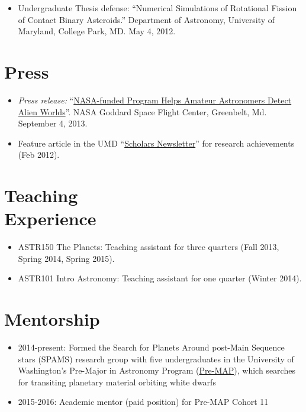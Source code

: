 \documentclass[margin]{res}
\begin{document}
\begin{resume}
\begin{itemize}
\item Undergraduate Thesis defense:  ``Numerical Simulations of Rotational Fission of Contact Binary Asteroids.'' Department of Astronomy, University of Maryland, College Park, MD. May 4, 2012.\\
\end{itemize}



\section{Press} 
\begin{itemize}
\item {\it Press release:} ``\href{http://www.nasa.gov/content/nasa-funded-program-helps-amateur-astronomers-detect-alien-worlds/}{NASA-funded Program Helps Amateur Astronomers Detect Alien Worlds}''. NASA Goddard Space Flight Center, Greenbelt, Md. September 4, 2013.

\item Feature article in the UMD ``\href{http://www.scholars.umd.edu/news/newsletter/363-february-2012-issue-1}{Scholars Newsletter}'' for research achievements (Feb 2012).\\
\end{itemize}              


\section{Teaching \\Experience}
\begin{itemize}   
\item ASTR150 The Planets: Teaching assistant for three quarters (Fall 2013, Spring 2014, Spring 2015).

\item ASTR101 Intro Astronomy: Teaching assistant for one quarter (Winter 2014). \\
\end{itemize}

\section{Mentorship}
\begin{itemize}
\item 2014-present: Formed the Search for Planets Around post-Main Sequence stars (SPAMS) research group with five undergraduates in the University of Washington's Pre-Major in Astronomy Program (\href{http://www.astro.washington.edu/users/premap/}{Pre-MAP}), which searches for transiting planetary material orbiting white dwarfs
\item 2015-2016: Academic mentor (paid position) for Pre-MAP Cohort 11\\
\end{itemize}


\end{resume}
\end{document}
